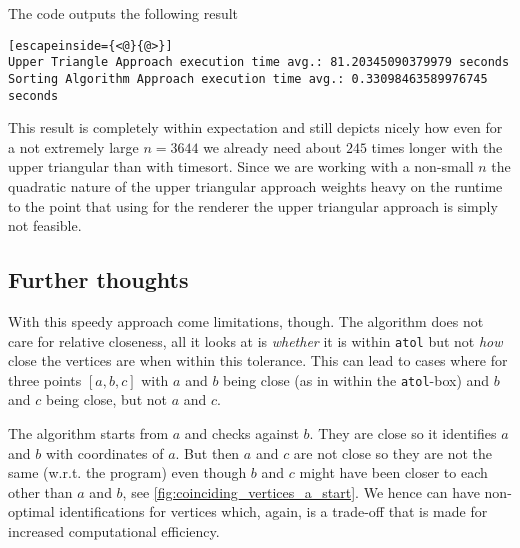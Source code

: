 The code outputs the following result
\begin{lstlisting}[escapeinside={<@}{@>}]
Upper Triangle Approach execution time avg.: 81.20345090379979 seconds
Sorting Algorithm Approach execution time avg.: 0.33098463589976745 seconds
\end{lstlisting}

This result is completely within expectation and still depicts nicely how even for a not extremely large $n=3644$ we already need about $245$ times longer with the upper triangular than with timesort. Since we are working with a non-small $n$ the quadratic nature of the upper triangular approach weights heavy on the runtime to the point that using for the renderer the upper triangular approach is simply not feasible.

\subsection{Further thoughts}
With this speedy approach come limitations, though. The algorithm does not care for relative closeness, all it looks at is \textit{whether} it is within \texttt{atol} but not \textit{how} close the vertices are when within this tolerance. This can lead to cases where for three points $[a, b, c]$ with $a$ and $b$ being close (as in within the \texttt{atol}-box) and $b$ and $c$ being close, but not $a$ and $c$.

The algorithm starts from $a$ and checks against $b$. They are close so it identifies $a$ and $b$ with coordinates of $a$. But then $a$ and $c$ are not close so they are not the same (w.r.t. the program) even though $b$ and $c$ might have been closer to each other than $a$ and $b$, see \autoref{fig:coinciding_vertices_a_start}. We hence can have non-optimal identifications for vertices which, again, is a trade-off that is made for increased computational efficiency.\\

